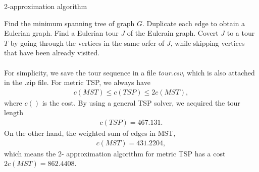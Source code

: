 \begin{algorithm}[H]
	\caption{ 2-approximation algorithm}
	\begin{algorithmic}[1]		
		\State Find the minimum spanning tree of graph $G$.
		\State Duplicate each edge to obtain a Eulerian graph.
		\State Find a Eulerian tour $J$ of the Eulerain graph.
		\State Covert $J$ to a tour $T$ by going through the vertices in the same orfer of $J$, while skipping vertices that have been already visited.
	\end{algorithmic}
\end{algorithm}

\paragraph{}
For simplicity, we save the tour sequence in a file \textit{tour.csv}, which is also attached in the .zip file. For metric TSP, we always have
\begin{align*}
c(MST) \leq c(TSP) \leq 2c(MST),
\end{align*}
where $c()$ is the cost. By using a general TSP solver, we acquired the tour length
\begin{align*}
c(TSP) = 467.131.
\end{align*}
On the other hand, the weighted sum of edges in MST,
\begin{align*}
c(MST) = 431.2204,
\end{align*}
which means the 2- approximation algorithm for metric TSP has a cost $2c(MST) = 862.4408$.
